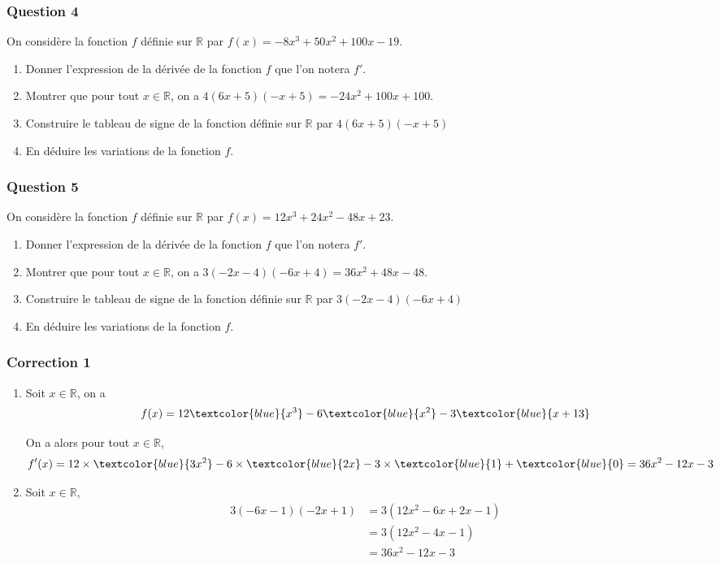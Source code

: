 \documentclass[15pt, mathserif]{beamer}
\newcommand{\R}{\mathbb{R}}			%
\begin{document}
\begin{frame} 
	\frametitle{Question 4}
On considère la fonction $f$ définie sur $\R$ par $f(x)=-8x^3 +50x^2+100x-19$. \begin{enumerate} 
 	 \item Donner l'expression de la dérivée de la fonction $f$ que l'on notera $f'$. 
 	 \item Montrer que pour tout $x \in \R$, on a $4(6x+5)(-x+5)=-24x^2+100x+100$. 
 	 \item Construire le tableau de signe de la fonction définie sur $\R$ par 
 \hfil$4(6x+5)(-x+5)$ 
 	 \item En déduire les variations de la fonction $f$. 
 
 \end{enumerate} 
 
 \end{frame}


\begin{frame} 
	\frametitle{Question 5}
On considère la fonction $f$ définie sur $\R$ par $f(x)=12x^3 +24x^2-48x+23$. \begin{enumerate} 
 	 \item Donner l'expression de la dérivée de la fonction $f$ que l'on notera $f'$. 
 	 \item Montrer que pour tout $x \in \R$, on a $3(-2x-4)(-6x+4)=36x^2+48x-48$. 
 	 \item Construire le tableau de signe de la fonction définie sur $\R$ par 
 \hfil$3(-2x-4)(-6x+4)$ 
 	 \item En déduire les variations de la fonction $f$. 
 
 \end{enumerate} 
 
 \end{frame}


\begin{frame}
\vspace{-10mm}
	\frametitle{Correction 1}
\begin{enumerate} 
 	 \item Soit $x \in \R$, on a $$f(x)=12\textcolor{blue}{x^3}-6\textcolor{blue}{x^2}-3\textcolor{blue}{x+13}$$
 
 On a alors pour tout $x \in  \R$, $$f'(x)= 12\times \textcolor{blue}{3x^2} -6\times \textcolor{blue}{2x}-3\times \textcolor{blue}{1}+\textcolor{blue}{0}=36x^2-12x-3$$
 	 \item Soit $x \in \R$, \begin{align*} 
 3(-6x-1)(-2x+1) & = 3\left( 12x^2 -6x +2x -1\right) \\ 
 &=  3\left( 12x^2 -4x -1\right) \\ 
 &= 36x^2 -12x -3
 \end{align*} \end{enumerate} 
 
 \end{frame} 
 
\end{document}
